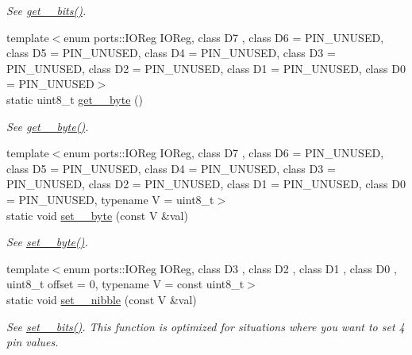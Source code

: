 \begin{DoxyCompactItemize}
\begin{DoxyCompactList}\small\item\em See \hyperlink{namespaceports_a9a1959ec95780c00a964b174a27b2a37}{get\+\_\+\_\+bits()}. \end{DoxyCompactList}\item 
{\footnotesize template$<$enum ports\+::\+I\+O\+Reg I\+O\+Reg, class D7 , class D6  = P\+I\+N\+\_\+\+U\+N\+U\+S\+ED, class D5  = P\+I\+N\+\_\+\+U\+N\+U\+S\+ED, class D4  = P\+I\+N\+\_\+\+U\+N\+U\+S\+ED, class D3  = P\+I\+N\+\_\+\+U\+N\+U\+S\+ED, class D2  = P\+I\+N\+\_\+\+U\+N\+U\+S\+ED, class D1  = P\+I\+N\+\_\+\+U\+N\+U\+S\+ED, class D0  = P\+I\+N\+\_\+\+U\+N\+U\+S\+ED$>$ }\\static uint8\+\_\+t \hyperlink{namespaceports_abcf67102d107c0aaad21fbb9f15563ae}{get\+\_\+\_\+byte} ()
\begin{DoxyCompactList}\small\item\em See \hyperlink{namespaceports_ae7d1ffc9ed6454ca61b006ffe43e4e6e}{get\+\_\+\_\+byte()}. \end{DoxyCompactList}\item 
{\footnotesize template$<$enum ports\+::\+I\+O\+Reg I\+O\+Reg, class D7 , class D6  = P\+I\+N\+\_\+\+U\+N\+U\+S\+ED, class D5  = P\+I\+N\+\_\+\+U\+N\+U\+S\+ED, class D4  = P\+I\+N\+\_\+\+U\+N\+U\+S\+ED, class D3  = P\+I\+N\+\_\+\+U\+N\+U\+S\+ED, class D2  = P\+I\+N\+\_\+\+U\+N\+U\+S\+ED, class D1  = P\+I\+N\+\_\+\+U\+N\+U\+S\+ED, class D0  = P\+I\+N\+\_\+\+U\+N\+U\+S\+ED, typename V  = uint8\+\_\+t$>$ }\\static void \hyperlink{namespaceports_a61265646961334c58df6d4ed66e290d0}{set\+\_\+\_\+byte} (const V \&val)
\begin{DoxyCompactList}\small\item\em See \hyperlink{namespaceports_a7034c689dd509dc9c11ba8be46a26fd0}{set\+\_\+\_\+byte()}. \end{DoxyCompactList}\item 
{\footnotesize template$<$enum ports\+::\+I\+O\+Reg I\+O\+Reg, class D3 , class D2 , class D1 , class D0 , uint8\+\_\+t offset = 0, typename V  = const uint8\+\_\+t$>$ }\\static void \hyperlink{namespaceports_af6d35bb70c3973212025200a2af3ac5c}{set\+\_\+\_\+nibble} (const V \&val)
\begin{DoxyCompactList}\small\item\em See \hyperlink{namespaceports_aac15fb87d8fede3f2bf8d764ab42965f}{set\+\_\+\_\+bits()}. This function is optimized for situations where you want to set 4 pin values. \end{DoxyCompactList}\end{DoxyCompactItemize}


